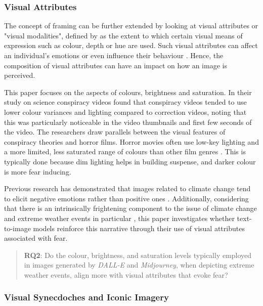 \subsubsection{Visual Attributes }

The concept of framing can be further extended by looking at visual attributes or "visual modalities", defined by \textcite[256]{Kress2020} as the extent to which certain visual means of expression such as colour, depth or hue are used. Such visual attributes can affect an individual's emotions \parencite{Valdez1994} or even influence their behaviour \parencite{Meier2012}. Hence, the composition of visual attributes can have an impact on how an image is perceived.

This paper focuses on the aspects of colours, brightness and saturation. In their study on science conspiracy videos \textcite{Chen2022} found that conspiracy videos tended to use lower colour variances and lighting compared to correction videos, noting that this was particularly noticeable in the video thumbnails and first few seconds of the video. The researchers draw parallels between the visual features of conspiracy theories and horror films. Horror movies often use low-key lighting and a more limited, less saturated range of colours than other film genres \parencite{Rasheed2005}. This is typically done because dim lighting helps in building suspense, and darker colour is more fear inducing. 

Previous research has demonstrated that images related to climate change tend to elicit negative emotions rather than positive ones \parencite{ONeill2017}. Additionally, considering that there is an intrinsically frightening component to the issue of climate change and extreme weather events in particular \parencite{Soutar2022}, this paper investigates whether text-to-image models reinforce this narrative through their use of visual attributes associated with fear.
\begin{quote}
\textbf{RQ2}: Do the colour, brightness, and saturation levels typically employed in images generated by \textit{DALL-E} and \textit{Midjourney}, when depicting extreme weather events, align more with visual attributes that evoke fear? 
\end{quote}
\subsubsection{Visual Synecdoches and Iconic Imagery}

